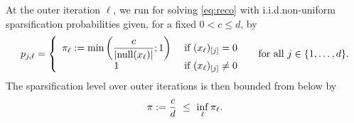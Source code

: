 At the outer iteration $\ell$, we run \salgo for solving \eqref{eq:reco} with i.i.d.\;non-uniform sparsification probabilities given, for a fixed $0<c\leq d$, by
\begin{align}
\label{eq:pvec}
p_{j,\ell} = \left\{ \begin{array}{cr}
 \pi_\ell := \min\left(\displaystyle\frac{c}{|\mathrm{null}(x_\ell)|};1\right) & \text{ if } (x_\ell)_{[j]} = 0 \\
   1  &  \text{ if } (x_\ell)_{[j]} \neq  0 
\end{array}   \right. ~~~~ \text{for all $j\in\{1,\dots,d\}$}.
\end{align}
The sparsification level over outer iterations is then bounded from below by
\begin{align*}
     \pi := \frac{c}{d} ~\leq~ \inf_\ell \pi_\ell.
\end{align*}


